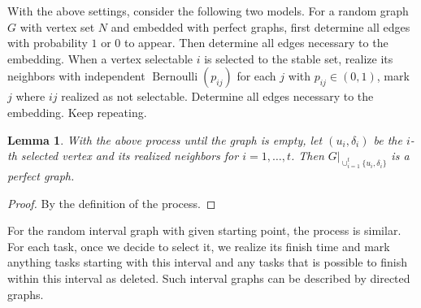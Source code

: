 \documentclass[10pt,leqno]{amsart}
\newtheorem{lemma}[theorem]{Lemma}
\begin{document}
With the above settings, consider the following two models. 
For a random graph $G$ with vertex set $N$ and embedded with perfect graphs, first determine all edges with probability $1$ or $0$ to appear.
Then determine all edges necessary to the embedding.
When a vertex selectable $i$ is selected to the stable set, realize its neighbors with independent $\operatorname{Bernoulli}(p_{ij})$ for each $j$ with $p_{ij}\in (0,1)$, mark $j$ where $ij$ realized as not selectable.
Determine all edges necessary to the embedding. Keep repeating.
\begin{lemma}
    With the above process until the graph is empty, let $(u_i,\delta_i)$ be the $i$-th selected vertex and its realized neighbors for $i=1,\ldots,t$.
    Then $G|_{\cup_{i=1}^{t}\{u_i,\delta_i\}}$ is a perfect graph.
\end{lemma}
\begin{proof}
    By the definition of the process.
\end{proof}
For the random interval graph with given starting point, the process is similar.
For each task, once we decide to select it, we realize its finish time and mark anything tasks starting with this interval and any tasks that is possible to finish within this interval as deleted.
Such interval graphs can be described by directed graphs.
\end{document}
